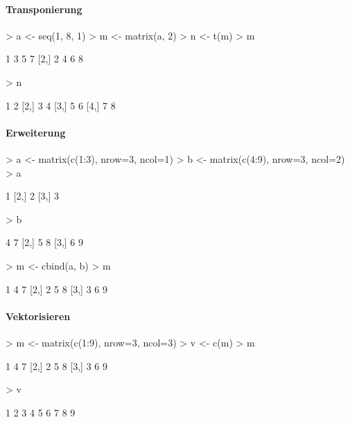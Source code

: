 \paragraph{Transponierung}
\begin{Schunk}
\begin{Sinput}
> a <- seq(1, 8, 1)
> m <- matrix(a, 2)
> n <- t(m)
> m
\end{Sinput}
\begin{Soutput}
     [,1] [,2] [,3] [,4]
[1,]    1    3    5    7
[2,]    2    4    6    8
\end{Soutput}
\begin{Sinput}
> n
\end{Sinput}
\begin{Soutput}
     [,1] [,2]
[1,]    1    2
[2,]    3    4
[3,]    5    6
[4,]    7    8
\end{Soutput}
\end{Schunk}

\paragraph{Erweiterung}
\begin{Schunk}
\begin{Sinput}
> a <- matrix(c(1:3), nrow=3, ncol=1)
> b <- matrix(c(4:9), nrow=3, ncol=2)
> a
\end{Sinput}
\begin{Soutput}
     [,1]
[1,]    1
[2,]    2
[3,]    3
\end{Soutput}
\begin{Sinput}
> b
\end{Sinput}
\begin{Soutput}
     [,1] [,2]
[1,]    4    7
[2,]    5    8
[3,]    6    9
\end{Soutput}
\begin{Sinput}
> m <- cbind(a, b)
> m
\end{Sinput}
\begin{Soutput}
     [,1] [,2] [,3]
[1,]    1    4    7
[2,]    2    5    8
[3,]    3    6    9
\end{Soutput}
\end{Schunk}

\paragraph{Vektorisieren}
\begin{Schunk}
\begin{Sinput}
> m <- matrix(c(1:9), nrow=3, ncol=3)
> v <- c(m)
> m
\end{Sinput}
\begin{Soutput}
     [,1] [,2] [,3]
[1,]    1    4    7
[2,]    2    5    8
[3,]    3    6    9
\end{Soutput}
\begin{Sinput}
> v
\end{Sinput}
\begin{Soutput}
[1] 1 2 3 4 5 6 7 8 9
\end{Soutput}
\end{Schunk}


